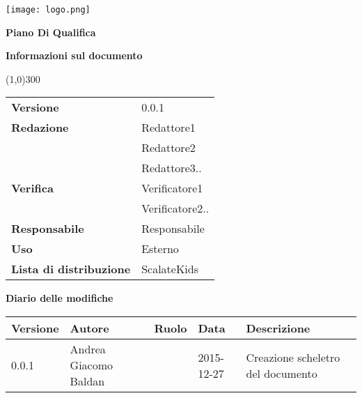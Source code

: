 \documentclass{scalatekids-article}
\begin{document}
\begin{titlepage}
  \centering
  \texttt{[image: logo.png]}\par\vspace{1cm}
  \vspace{1.5cm}
         {\Huge\bfseries Piano Di Qualifica \par}
         \begin{center}
           \vspace{1.0cm}
                  {\large\bfseries Informazioni sul documento \par}
         \end{center}
         \vspace{-1cm}
         \begin{center}
           \line(1,0){300}
         \end{center}
         \vspace{0cm}
         \begin{tabular}[c]{l|l}
           \textbf{Versione} & 0.0.1\\
           \textbf{Redazione} & Redattore1\\ & Redattore2\\ & Redattore3..\\
           \textbf{Verifica} & Verificatore1\\ & Verificatore2..\\
           \textbf{Responsabile} & Responsabile\\
           \textbf{Uso} & Esterno\\
           \textbf{Lista di distribuzione} & ScalateKids
         \end{tabular}
\end{titlepage}
\clearpage
\setcounter{page}{1}
\begin{flushleft}
  \vspace{0cm}
         {\large\bfseries Diario delle modifiche \par}
\end{flushleft}
\vspace{0cm}
\begin{center}
  \begin{tabular}{| l | l | l | l | l |}
    \hline
    Versione & Autore & Ruolo & Data & Descrizione \\
    \hline
    0.0.1 & Andrea Giacomo Baldan & & 2015-12-27 & Creazione scheletro del documento\\
    \hline
  \end{tabular}
\end{center}
\tableofcontents
\newpage
\end{document}
